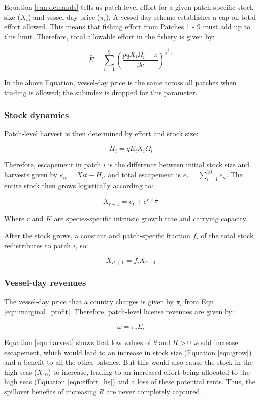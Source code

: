 \documentclass[12pt]{article}
\begin{document}
Equation \ref{eqn:demands} tells us patch-level effort for a given patch-specific stock size ($X_i$) and vessel-day price ($\pi_i$). A vessel-day scheme establishes a cap on total effort allowed. This means that fishing effort from Patches 1 - 9 must add up to this limit. Therefore, total allowable effort in the fishery is given by:

$$
\bar{E} = \sum_{i = 1}^9\left(\frac{pqX_i\Omega_i - \pi}{\beta c }\right) ^ {\frac{1}{\beta - 1}}
\label{eqn:Ebar}
$$

In the above Equation, vessel-day price is the same across all patches when trading is allowed; the subindex is dropped for this parameter.

\subsubsection{Stock dynamics}

Patch-level harvest is then determined by effort and stock size:

$$
H_i = qE_iX_i\Omega_i
\label{eqn:harvest}
$$

Therefore, escapement in patch $i$ is the difference between initial stock size and harvests given by $e_{it} = X{it} - H_{it}$ and total escapement is $e_t=\sum_{i=1}^{10}e_{it}$. The entire stock then grows logistically according to:

$$
X_{t+1} = e_t + e^{r \times \frac{e}{K}}
\label{eqn:grow}
$$

Where $r$ and $K$ are species-specific intrinsic growth rate and carrying capacity.

After the stock grows, a constant and patch-specific fraction $f_i$ of the total stock redistributes to patch $i$, so:

$$
X_{it+1} = f_iX_{t+1}
\label{eqn:disperse}
$$

\subsubsection{Vessel-day revenues}

The vessel-day price that a country charges is given by $\pi_i$ from Eqn \ref{eqn:marginal_profit}. Therefore, patch-level license revenues are given by:

$$
\omega = \pi_iE_i
\label{eqn:license_revenue}
$$

Equation \ref{eqn:harvest} shows that low values of $\theta$ and $R > 0$ would increase escapement, which would lead to an increase in stock size (Equation \ref{eqn:grow}) and a benefit to all the other patches. But this would also cause the stock in the high seas ($X_{10}$) to increase, leading to an increased effort being allocated to the high seas (Equation \ref{eqn:effort_hs}) and a loss of these potential rents. Thus, the spillover benefits of increasing $R$ are never completely captured.
\end{document}
